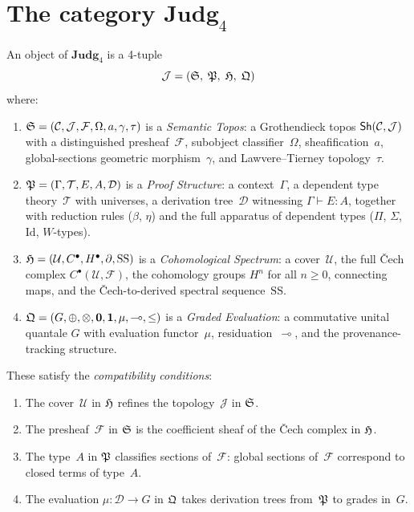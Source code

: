 \section{The category $\mathbf{Judg}_4$}
\label{sec:judg4}

\begin{definition}
\label{def:judg4-obj}
An object of $\mathbf{Judg}_4$ is a 4-tuple
\[
  \mathcal{J} = (\mathfrak{S},\; \mathfrak{P},\; \mathfrak{H},\; \mathfrak{Q})
\]
where:
\begin{enumerate}[label=(\roman*),nosep]
\item $\mathfrak{S} = (\mathcal{C}, \mathcal{J}, \mathcal{F}, \Omega,
  a, \gamma, \tau)$ is a \emph{Semantic Topos}:
  a Grothendieck topos $\mathsf{Sh}(\mathcal{C}, \mathcal{J})$ with a
  distinguished presheaf~$\mathcal{F}$, subobject classifier~$\Omega$,
  sheafification~$a$, global-sections geometric morphism~$\gamma$,
  and Lawvere--Tierney topology~$\tau$.
\item $\mathfrak{P} = (\Gamma, \mathcal{T}, E, A, \mathcal{D})$ is a
  \emph{Proof Structure}: a context~$\Gamma$, a dependent type
  theory~$\mathcal{T}$ with universes, a derivation tree~$\mathcal{D}$
  witnessing $\Gamma \vdash E : A$, together with reduction rules
  ($\beta$, $\eta$) and the full apparatus of dependent types
  ($\Pi$, $\Sigma$, $\mathrm{Id}$, $W$-types).
\item $\mathfrak{H} = (\mathcal{U}, C^\bullet, H^\bullet, \partial, \mathrm{SS})$
  is a \emph{Cohomological Spectrum}: a cover~$\mathcal{U}$, the full
  \v{C}ech complex $C^\bullet(\mathcal{U}, \mathcal{F})$, the
  cohomology groups $H^n$ for all $n \geq 0$, connecting maps, and
  the \v{C}ech-to-derived spectral sequence~$\mathrm{SS}$.
\item $\mathfrak{Q} = (G, \oplus, \otimes, \mathbf{0}, \mathbf{1}, \mu, \multimap, \leq)$
  is a \emph{Graded Evaluation}: a commutative unital quantale $G$
  with evaluation functor~$\mu$, residuation~$\multimap$, and the
  provenance-tracking structure.
\end{enumerate}
These satisfy the \emph{compatibility conditions}:
\begin{enumerate}[label=(K\arabic*),nosep]
\item The cover~$\mathcal{U}$ in $\mathfrak{H}$ refines the
  topology~$\mathcal{J}$ in $\mathfrak{S}$.
\item The presheaf~$\mathcal{F}$ in $\mathfrak{S}$ is the coefficient sheaf
  of the \v{C}ech complex in $\mathfrak{H}$.
\item The type~$A$ in $\mathfrak{P}$ classifies sections of~$\mathcal{F}$:
  global sections of~$\mathcal{F}$ correspond to closed terms of type~$A$.
\item The evaluation $\mu : \mathcal{D} \to G$ in $\mathfrak{Q}$ takes
  derivation trees from~$\mathfrak{P}$ to grades in~$G$.
\end{enumerate}
\end{definition}

